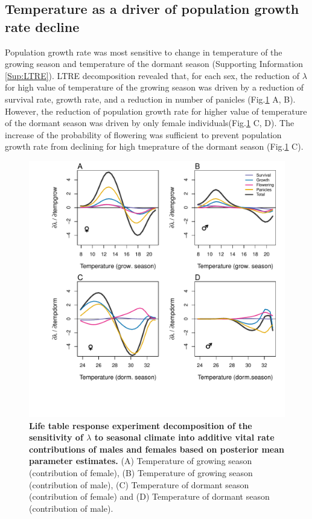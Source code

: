 \documentclass[12pt]{article}
\begin{document}
\subsection*{Temperature as a driver of population growth rate decline }
Population growth rate was most sensitive to change in temperature of the growing season and temperature of the dormant season (Supporting Information \ref{Sup:LTRE}). 
LTRE decomposition revealed that, for each sex, the reduction of $\lambda$ for high value of temperature of the growing season was driven by a reduction of survival rate, growth rate, and a reduction in number of panicles (Fig.\ref{fig:LTRETemp} A, B). 
However, the reduction of population growth rate for higher value of temperature of the dormant season was driven by only female individuals(Fig.\ref{fig:LTRETemp} C, D). 
The increase of the probability of flowering was sufficient to prevent population growth rate from declining for high tmeprature of the dormant season (Fig.\ref{fig:LTRETemp} C).
\begin{figure}[H]
  \begin{center}
    \includegraphics[width=0.85\linewidth]{Figures/LTRE_Temperature.pdf}
  \caption{\textbf{Life table response experiment decomposition of the sensitivity of $\lambda$ to seasonal climate into additive vital rate contributions of males and females based on posterior mean parameter estimates.}
 (A) Temperature of growing season (contribution of female), (B) Temperature of growing season (contribution of male),  (C) Temperature of dormant season (contribution of female) and (D) Temperature of dormant season (contribution of male).}
  \label{fig:LTRETemp}
  \end{center}
\end{figure}
\end{document}
